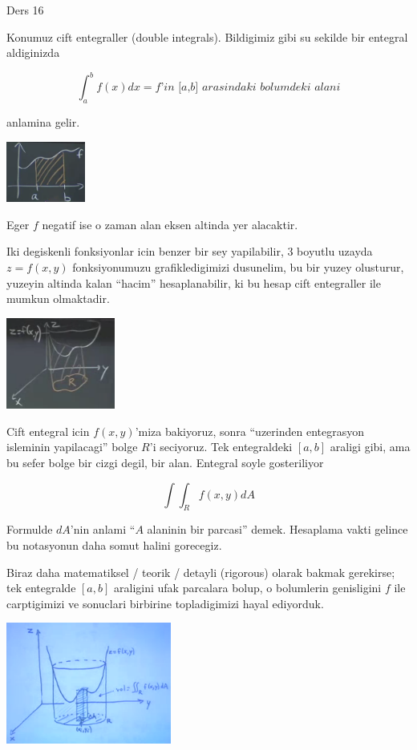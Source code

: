\documentclass[12pt,fleqn]{article}\usepackage{../common}
\begin{document}
Ders 16

Konumuz cift entegraller (double integrals). Bildigimiz gibi su sekilde bir
entegral aldiginizda

\[ \int_a^bf(x)dx = \textit{f'in [a,b] arasindaki bolumdeki alani} \]

anlamina gelir. 

\includegraphics[height=2cm]{16_1.png}

Eger $f$ negatif ise o zaman alan eksen altinda yer alacaktir. 

Iki degiskenli fonksiyonlar icin benzer bir sey yapilabilir, 3 boyutlu
uzayda $z=f(x,y)$ fonksiyonumuzu grafikledigimizi dusunelim, bu bir yuzey olusturur,
yuzeyin altinda kalan ``hacim'' hesaplanabilir, ki bu hesap cift
entegraller ile mumkun olmaktadir. 

\includegraphics[height=3cm]{16_2.png}

Cift entegral icin $f(x,y)$'miza bakiyoruz, sonra ``uzerinden entegrasyon
isleminin yapilacagi'' bolge $R$'i seciyoruz. Tek entegraldeki $[a,b]$
araligi gibi, ama bu sefer bolge bir cizgi degil, bir alan. Entegral soyle
gosteriliyor 

\[ \int \int_R f(x,y) dA \]

Formulde $dA$'nin anlami ``$A$ alaninin bir parcasi'' demek. Hesaplama
vakti gelince bu notasyonun daha somut halini gorecegiz. 

Biraz daha matematiksel / teorik / detayli (rigorous) olarak bakmak
gerekirse; tek entegralde $[a,b]$ araligini ufak parcalara bolup, o
bolumlerin genisligini $f$ ile carptigimizi ve sonuclari birbirine
topladigimizi hayal ediyorduk. 

\includegraphics[height=4cm]{16_3.png}
\end{document}
